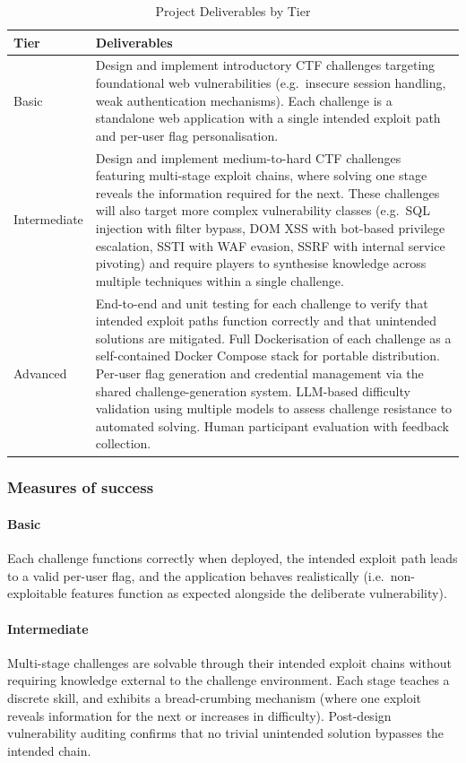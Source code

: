 \begin{table}[h]
\centering
\caption{Project Deliverables by Tier}
\label{tab:deliverables}
\begin{tabular}{|p{1.5cm}|p{6.2cm}|}
\hline
\textbf{Tier} & \textbf{Deliverables} \\ \hline
Basic &
Design and implement introductory CTF challenges targeting
foundational web vulnerabilities (e.g.\ insecure session handling,
weak authentication mechanisms). Each challenge is a standalone
web application with a single intended exploit path and per-user
flag personalisation. \\ \hline
Intermediate &
Design and implement medium-to-hard CTF challenges featuring
multi-stage exploit chains, where solving one stage reveals the
information required for the next. These challenges will also target more
complex vulnerability classes (e.g.\ SQL injection with filter
bypass, DOM XSS with bot-based privilege escalation, SSTI with
WAF evasion, SSRF with internal service pivoting) and require
players to synthesise knowledge across multiple techniques within
a single challenge. \\ \hline
Advanced &
End-to-end and unit testing for each challenge to verify that
intended exploit paths function correctly and that unintended
solutions are mitigated.
Full Dockerisation of each challenge as a self-contained
Docker Compose stack for portable distribution.
Per-user flag generation and credential management via the
shared challenge-generation system.
LLM-based difficulty validation using multiple models to assess
challenge resistance to automated solving.
Human participant evaluation with feedback collection. \\ \hline
\end{tabular}
\end{table}

\subsubsection{Measures of success}

\paragraph{\textbf{Basic}} Each challenge functions correctly when deployed, the
intended exploit path leads to a valid per-user flag, and the
application behaves realistically (i.e.\ non-exploitable features
function as expected alongside the deliberate vulnerability).
\paragraph{\textbf{Intermediate}} Multi-stage challenges are solvable through
their intended exploit chains without requiring knowledge external
to the challenge environment. Each stage teaches a discrete skill,
and exhibits a bread-crumbing mechanism (where one exploit reveals information
for the next or increases in difficulty). Post-design vulnerability auditing
confirms that no trivial unintended solution bypasses the intended
chain.
